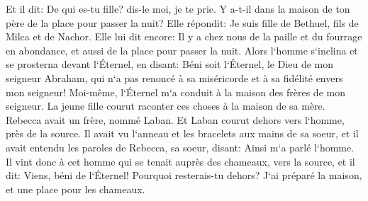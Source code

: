 \verse Et il dit: De qui es-tu fille? dis-le moi, je te prie. Y a-t-il dans la maison de ton père de la place pour passer la nuit? 
\verse Elle répondit: Je suis fille de Bethuel, fils de Milca et de Nachor. 
\verse Elle lui dit encore: Il y a chez nous de la paille et du fourrage en abondance, et aussi de la place pour passer la nuit. 
\verse Alors l`homme s`inclina et se prosterna devant l`Éternel, 
\verse en disant: Béni soit l`Éternel, le Dieu de mon seigneur Abraham, qui n`a pas renoncé à sa miséricorde et à sa fidélité envers mon seigneur! Moi-même, l`Éternel m`a conduit à la maison des frères de mon seigneur. 
\verse La jeune fille courut raconter ces choses à la maison de sa mère. 
\verse Rebecca avait un frère, nommé Laban. Et Laban courut dehors vers l`homme, près de la source. 
\verse Il avait vu l`anneau et les bracelets aux mains de sa soeur, et il avait entendu les paroles de Rebecca, sa soeur, disant: Ainsi m`a parlé l`homme. Il vint donc à cet homme qui se tenait auprès des chameaux, vers la source, 
\verse et il dit: Viens, béni de l`Éternel! Pourquoi resterais-tu dehors? J`ai préparé la maison, et une place pour les chameaux. 
